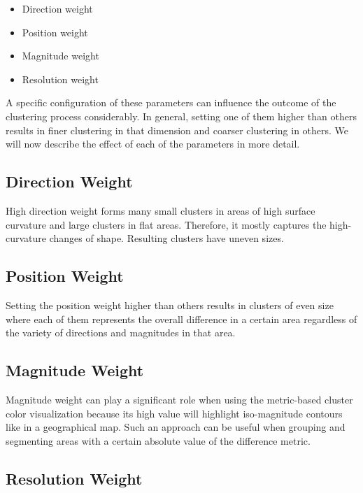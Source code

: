 \begin{itemize}
\item Direction weight
\item Position weight
\item Magnitude weight
\item Resolution weight
\end{itemize}

A specific configuration of these parameters can influence the outcome of the clustering process considerably. In general, setting one of them higher than others results in finer clustering in that dimension and coarser clustering in others. We will now describe the effect of each of the parameters in more detail.

\subsection{Direction Weight}

High direction weight forms many small clusters in areas of high surface curvature and large clusters in flat areas. Therefore, it mostly captures the high-curvature changes of shape. Resulting clusters have uneven sizes.
\subsection{Position Weight}

Setting the position weight higher than others results in clusters of even size where each of them represents the overall difference in a certain area regardless of the variety of directions and magnitudes in that area.
\subsection{Magnitude Weight}

Magnitude weight can play a significant role when using the metric-based cluster color visualization because its high value will highlight iso-magnitude contours like in a geographical map. Such an approach can be useful when grouping and segmenting areas with a certain absolute value of the difference metric.
\subsection{Resolution Weight}

